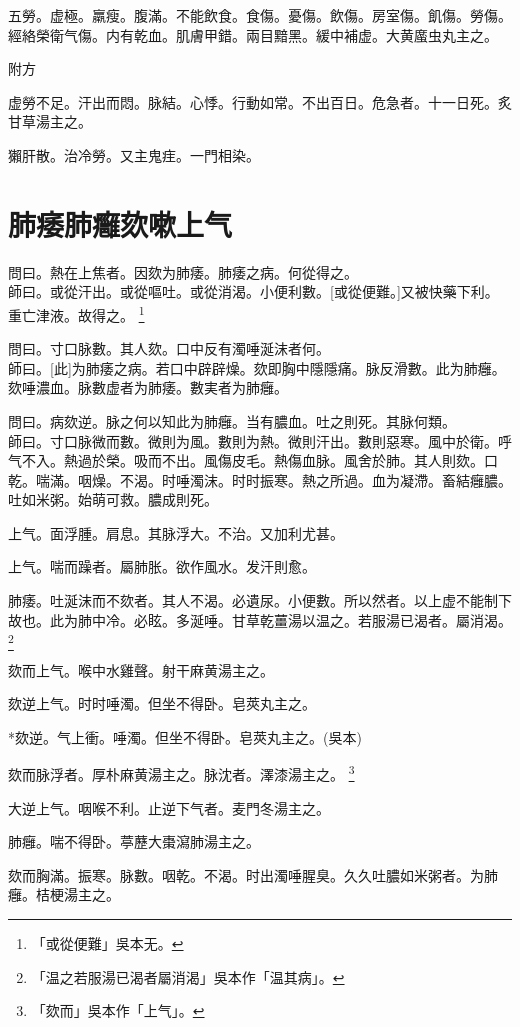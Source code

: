 \documentclass[12pt,oneside,UTF8,b5paper]{ctexbook}她她她她她她她
\begin{document}
五勞。虚極。羸瘦。腹滿。不能飲食。食傷。憂傷。飲傷。房室傷。飢傷。勞傷。經絡榮衛气傷。内有乾血。肌膚甲錯。兩目黯黑。緩中補虚。大黄䗪虫丸主之。

附方

虚勞不足。汗出而悶。脉結。心悸。行動如常。不出百日。危急者。十一日死。炙甘草湯主之。

獺肝散。治冷勞。又主鬼疰。一門相染。

\chapter{肺痿肺癰欬嗽上气}

問曰。熱在上焦者。因欬为肺痿。肺痿之病。何從得之。\\
師曰。或從汗出。或從嘔吐。或從消渴。小便利數。[或從便難。]又被快藥下利。重亡津液。故得之。
	\footnote{「或從便難」吳本无。}

問曰。寸口脉數。其人欬。口中反有濁唾涎沫者何。\\
師曰。[此]为肺痿之病。若口中辟辟燥。欬即胸中隱隱痛。脉反滑數。此为肺癰。欬唾濃血。脉數虚者为肺痿。數実者为肺癰。

問曰。病欬逆。脉之何以知此为肺癰。当有膿血。吐之則死。其脉何類。\\
師曰。寸口脉微而數。微則为風。數則为熱。微則汗出。數則惡寒。風中於衛。呼气不入。熱過於榮。吸而不出。風傷皮毛。熱傷血脉。風舍於肺。其人則欬。口乾。喘滿。咽燥。不渴。时唾濁沫。时时振寒。熱之所過。血为凝滯。畜結癰膿。吐如米粥。始萌可救。膿成則死。

上气。面浮腫。肩息。其脉浮大。不治。又加利尤甚。

上气。喘而躁者。屬肺胀。欲作風水。发汗則愈。

肺痿。吐涎沫而不欬者。其人不渴。必遺尿。小便數。所以然者。以上虚不能制下故也。此为肺中冷。必眩。多涎唾。甘草乾薑湯以温之。若服湯已渴者。屬消渴。
	\footnote{「温之若服湯已渴者屬消渴」吳本作「温其病」。}

欬而上气。喉中水雞聲。射干麻黄湯主之。

欬逆上气。时时唾濁。但坐不得卧。皂莢丸主之。

*欬逆。气上衝。唾濁。但坐不得卧。皂莢丸主之。(吳本)

欬而脉浮者。厚朴麻黄湯主之。脉沈者。澤漆湯主之。
	\footnote{「欬而」吳本作「上气」。}

大逆上气。咽喉不利。止逆下气者。麦門冬湯主之。

肺癰。喘不得卧。葶藶大棗瀉肺湯主之。

欬而胸滿。振寒。脉數。咽乾。不渴。时出濁唾腥臭。久久吐膿如米粥者。为肺癰。桔梗湯主之。
\end{document}
